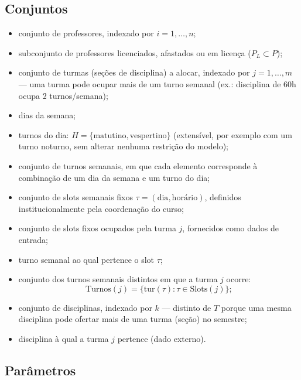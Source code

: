 \documentclass[11pt,a4paper]{article}
\begin{document}
\subsection{Conjuntos}
\begin{itemize}[leftmargin=2.2cm]
  \item[$P$] conjunto de professores, indexado por $i = 1, \dots, n$;
  \item[$P_L$] subconjunto de professores licenciados, afastados ou em licença ($P_L \subset P$);
  \item[$T$] conjunto de turmas (seções de disciplina) a alocar, indexado por $j = 1, \dots, m$ --- uma turma pode ocupar mais de um turno semanal (ex.: disciplina de 60h ocupa 2 turnos/semana);
  \item[$D$] dias da semana;
  \item[$H$] turnos do dia: $ H=\{\text{matutino},\text{vespertino}\}$ (extensível, por exemplo com um turno noturno, sem alterar nenhuma restrição do modelo);
  \item[$R=D\times H$] conjunto de turnos semanais, em que cada
elemento corresponde à combinação de um dia da semana e um turno
do dia;

\item[$S$] conjunto de slots semanais fixos
$\tau=(\text{dia},\text{horário})$, definidos institucionalmente
pela coordenação do curso;

\item[$\mathrm{Slots}(j)\subseteq S$] conjunto de slots fixos
ocupados pela turma $j$, fornecidos como dados de entrada;

\item[$\mathrm{tur}(\tau)\in R$] turno semanal ao qual pertence
o slot $\tau$;

\item[$\mathrm{Turnos}(j)\subseteq R$] conjunto dos turnos
semanais distintos em que a turma $j$ ocorre:
\[
\mathrm{Turnos}(j)=
\{\mathrm{tur}(\tau):\tau\in\mathrm{Slots}(j)\};
\]
  \item[$K$] conjunto de disciplinas, indexado por $k$ --- distinto de $T$ porque uma mesma disciplina pode ofertar mais de uma turma (seção) no semestre;
  \item[$\text{Disc}(j) \in K$] disciplina à qual a turma $j$ pertence (dado externo).
\end{itemize}

\subsection{Parâmetros}
\end{document}
